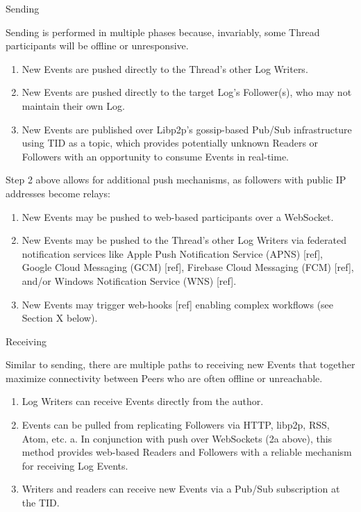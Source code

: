 \documentclass{comjnl}
\begin{document}
Sending

Sending is performed in multiple phases because, invariably, some Thread participants will be offline or unresponsive. 

\begin{enumerate}
\item \label{Perf1}New Events are pushed directly to the Thread’s other Log Writers.
\item \label{Perf2}New Events are pushed directly to the target Log’s Follower(s), who may not maintain their own Log.
\item \label{Perf3} New Events are published over Libp2p’s gossip-based Pub/Sub infrastructure using TID as a topic, which provides potentially unknown Readers or Followers with an opportunity to consume Events in real-time.
\end{enumerate}

Step 2 above allows for additional push mechanisms, as followers with public IP addresses become relays:

\begin{enumerate}
\item \label{Perf1}New Events may be pushed to web-based participants over a WebSocket.
\item \label{Perf2}New Events may be pushed to the Thread’s other Log Writers via federated notification services like Apple Push Notification Service (APNS) [ref], Google Cloud Messaging (GCM) [ref], Firebase Cloud Messaging (FCM) [ref], and/or Windows Notification Service (WNS) [ref].
\item \label{Perf3} New Events may trigger web-hooks [ref] enabling complex workflows (see Section X below).
\end{enumerate}

Receiving

Similar to sending, there are multiple paths to receiving new Events that together maximize connectivity between Peers who are often offline or unreachable.

\begin{enumerate}
\item \label{Perf1}Log Writers can receive Events directly from the author.
\item \label{Perf2} Events can be pulled from replicating Followers via HTTP, libp2p, RSS, Atom, etc.
    a. In conjunction with push over WebSockets (2a above), this method provides web-based Readers and Followers with a reliable mechanism for receiving Log Events.
\item \label{Perf3} Writers and readers can receive new Events via a Pub/Sub subscription at the TID.
\end{enumerate}
\end{document}
